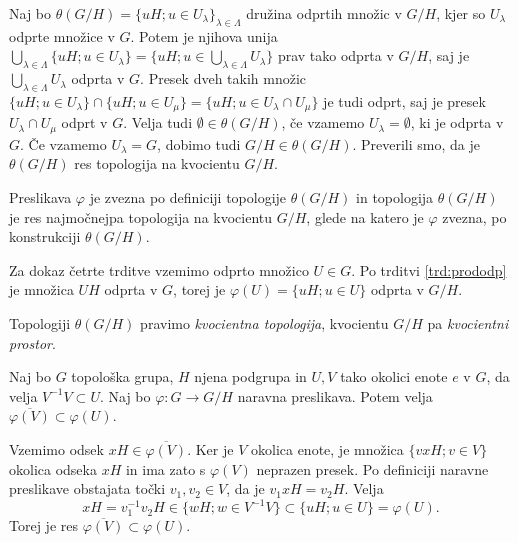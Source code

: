 \documentclass[mat1]{fmfdelo}
\newcommand{\closure}[1]{\overline{#1}}
\begin{document}
\begin{dokaz}
Naj bo $\theta(G/H) = \lbrace uH ; u \in U_\lambda \rbrace_{\lambda \in \Lambda}$ družina odprtih množic v $G/H$, kjer so $U_\lambda$ odprte množice v $G$. Potem je njihova unija $\bigcup_{\lambda \in \Lambda} \lbrace uH ; u \in U_\lambda \rbrace = \lbrace uH ; u \in \bigcup_{\lambda \in \Lambda}U_\lambda \rbrace$ prav tako odprta v $G/H$, saj je $\bigcup_{\lambda \in \Lambda}U_\lambda$ odprta v $G$. Presek dveh takih množic $\lbrace uH ; u \in U_\lambda \rbrace \cap \lbrace uH ; u \in U_\mu \rbrace = \lbrace uH ; u \in U_\lambda \cap U_\mu \rbrace$ je tudi odprt, saj je presek $U_\lambda \cap U_\mu$ odprt v $G$. Velja tudi $\emptyset \in \theta(G/H)$, če vzamemo $U_\lambda = \emptyset$, ki je odprta v $G$. Če vzamemo $U_\lambda = G$, dobimo tudi $G/H \in \theta(G/H)$. Preverili smo, da je $\theta(G/H)$ res topologija na kvocientu $G/H$.

Preslikava $\varphi$ je zvezna po definiciji topologije $\theta(G/H)$ in topologija $\theta(G/H)$ je res najmočnejpa topologija na kvocientu $G/H$, glede na katero je $\varphi$ zvezna, po konstrukciji $\theta(G/H)$.

Za dokaz četrte trditve vzemimo odprto množico $U \in G$. Po trditvi \ref{trd:prododp} je množica $UH$ odprta v $G$, torej je $\varphi(U) = \lbrace uH ; u \in U \rbrace$ odprta v $G/H$.
\end{dokaz}

Topologiji $\theta(G/H)$ pravimo \emph{kvocientna topologija}, kvocientu $G/H$ pa \emph{kvocientni prostor}.


\begin{trditev}\label{trd:okolicevkvoc}
Naj bo $G$ topološka grupa, $H$ njena podgrupa in $U, V$ tako okolici enote $e$ v $G$, da velja $V^{-1}V \subset U$. Naj bo $\varphi: G \to G/H$ naravna preslikava. Potem velja $\closure{\varphi(V)} \subset \varphi(U)$.
\end{trditev}

\begin{dokaz}
Vzemimo odsek $xH \in \closure{\varphi(V)}$. Ker je $V$ okolica enote, je množica $\lbrace vxH ; v \in V \rbrace$ okolica odseka $xH$ in ima zato s $\varphi(V)$ neprazen presek. Po definiciji naravne preslikave obstajata točki $v_1, v_2 \in V$, da je $v_1xH = v_2H$. Velja \[xH = v_1^{-1}v_2H \in \lbrace wH ; w \in V^{-1}V \rbrace \subset \lbrace uH ; u \in U \rbrace = \varphi(U). \]
Torej je res $\closure{\varphi(V)} \subset \varphi(U)$.
\end{dokaz}
\end{document}
